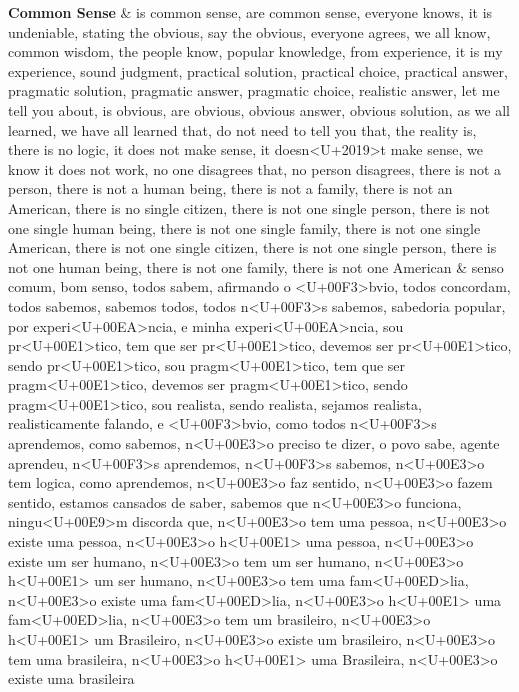 \documentclass[smallextended]{svjour3}       %
\begin{document}
\begin{landscape}
\begin{longtabu}
\textbf{Common Sense} & is common sense, are common sense, everyone knows, it is undeniable, stating the obvious, say the obvious, everyone agrees, we all know, common wisdom, the people know, popular knowledge, from experience, it is my experience, sound judgment, practical solution, practical choice, practical answer, pragmatic solution, pragmatic answer, pragmatic choice, realistic answer, let me tell you about, is obvious, are obvious, obvious answer, obvious solution, as we all learned, we have all learned that, do not need to tell you that, the reality is, there is no logic, it does not make sense, it doesn<U+2019>t make sense, we know it does not work, no one disagrees that, no person disagrees, there is not a person, there is not a human being, there is not a family, there is not an American, there is no single citizen, there is not one single person, there is not one single human being, there is not one single family, there is not one single American, there is not one single citizen, there is not one single person, there is not one human being, there is not one family, there is not one American & senso comum, bom senso, todos sabem, afirmando o <U+00F3>bvio, todos concordam, todos sabemos, sabemos todos, todos n<U+00F3>s sabemos, sabedoria popular, por experi<U+00EA>ncia, e minha experi<U+00EA>ncia, sou pr<U+00E1>tico, tem que ser pr<U+00E1>tico, devemos ser pr<U+00E1>tico, sendo pr<U+00E1>tico, sou pragm<U+00E1>tico, tem que ser pragm<U+00E1>tico, devemos ser  pragm<U+00E1>tico, sendo pragm<U+00E1>tico, sou realista, sendo realista, sejamos realista, realisticamente falando, e <U+00F3>bvio, como todos n<U+00F3>s aprendemos, como sabemos, n<U+00E3>o preciso te dizer, o povo sabe, agente aprendeu, n<U+00F3>s aprendemos, n<U+00F3>s sabemos, n<U+00E3>o tem logica, como aprendemos, n<U+00E3>o faz sentido, n<U+00E3>o fazem sentido, estamos cansados de saber, sabemos que n<U+00E3>o funciona, ningu<U+00E9>m discorda que, n<U+00E3>o tem uma pessoa, n<U+00E3>o existe uma pessoa, n<U+00E3>o h<U+00E1> uma pessoa, n<U+00E3>o existe um ser humano, n<U+00E3>o tem um ser humano, n<U+00E3>o h<U+00E1> um ser humano, n<U+00E3>o tem uma fam<U+00ED>lia, n<U+00E3>o existe uma fam<U+00ED>lia, n<U+00E3>o h<U+00E1> uma fam<U+00ED>lia, n<U+00E3>o tem um brasileiro, n<U+00E3>o h<U+00E1> um Brasileiro, n<U+00E3>o existe um brasileiro, n<U+00E3>o tem uma brasileira, n<U+00E3>o h<U+00E1> uma Brasileira, n<U+00E3>o existe uma brasileira\\

\end{longtabu}
\end{landscape}
\end{document}
